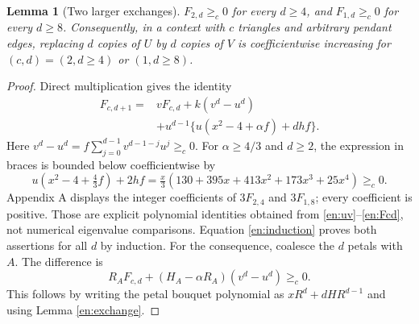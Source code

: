 \documentclass[12pt]{amsart}
\newtheorem{lem}[thm]{Lemma}
\theoremstyle{definition}
\theoremstyle{remark}
\numberwithin{equation}{section}
\begin{document}
\begin{lem}[Two larger exchanges]\label{en:large}
$F_{2,d}\ge_c0$ for every $d\ge4$, and $F_{1,d}\ge_c0$ for every
$d\ge8$. Consequently, in a context with $c$ triangles and arbitrary
pendant edges, replacing $d$ copies of $U$ by $d$ copies of $V$ is
coefficientwise increasing for $(c,d)=(2,d\ge4)$ or $(1,d\ge8)$.
\end{lem}
\begin{proof}
Direct multiplication gives the identity
\begin{align}
 F_{c,d+1}={}&vF_{c,d}+k(v^d-u^d)\nonumber\\
 &+u^{d-1}\{u(x^2-4+\alpha f)+dhf\}.\label{en:induction}
\end{align}
Here $v^d-u^d=f\sum_{j=0}^{d-1}v^{d-1-j}u^j\ge_c0$. For
$\alpha\ge4/3$ and $d\ge2$, the expression in braces is bounded below
coefficientwise by
\begin{equation}\label{en:Kpositive}
 u(x^2-4+\tfrac43f)+2hf
   =\tfrac{x}{3}(130+395x+413x^2+173x^3+25x^4)\ge_c0.
\end{equation}
Appendix A displays the integer coefficients of $3F_{2,4}$ and
$3F_{1,8}$; every coefficient is positive. Those are explicit polynomial
identities obtained from \eqref{en:uv}--\eqref{en:Fcd}, not numerical
eigenvalue comparisons. Equation \eqref{en:induction} proves both
assertions for all $d$ by induction.
For the consequence, coalesce the $d$ petals with $A$. The difference is
\[
 R_A F_{c,d}+(H_A-\alpha R_A)(v^d-u^d)\ge_c0.
\]
This follows by writing the petal bouquet polynomial as
$xR^d+dHR^{d-1}$ and using Lemma \ref{en:exchange}.
\end{proof}
\end{document}
